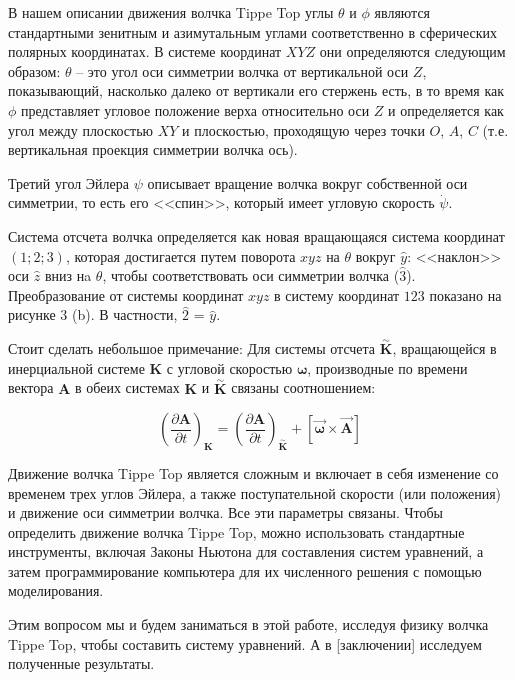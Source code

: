 \documentclass[a4paper,11.5pt]{article} %
\begin{document}
В нашем описании движения волчка Tippe Top углы $\theta$ и $\phi$ являются стандартными зенитным и азимутальным углами соответственно в сферических полярных координатах. В системе координат $XYZ$ они определяются следующим образом: $\theta$ -- это угол оси симметрии волчка от вертикальной оси $Z$, показывающий, насколько далеко от вертикали его стержень есть, в то время как $\phi$ представляет угловое положение верха относительно оси $Z$ и определяется как угол между плоскостью $XY$ и плоскостью, проходящую через точки $O$, $A$, $C$ (т.е. вертикальная проекция симметрии волчка ось).

Третий угол Эйлера $\psi$ описывает вращение волчка вокруг собственной оси симметрии, то есть его <<спин>>, который имеет угловую скорость $\dot{\psi}$.

Система отсчета волчка определяется как новая вращающаяся система координат $(1;2;3)$, которая достигается путем поворота $xyz$ на $\theta$ вокруг $\hat{y}$: <<наклон>> оси $\hat{z}$ вниз нa $\theta$, чтобы соответствовать оси симметрии волчка ($\hat{3}$). Преобразование от системы координат $xyz$ в систему координат $123$ показано на рисунке 3 (b). В частности, $\hat{2}$ = $\hat{y}$.

Стоит сделать небольшое примечание:
Для системы отсчета $\mathbf{\stackrel{\sim}{\textbf{K}}}$, вращающейся в инерциальной системе $\textbf{K}$ с угловой скоростью $\mathbf{\omega}$, производные по времени вектора $\textbf{A}$ в обеих системах $\textbf{K}$ и $\mathbf{\stackrel{\sim}{\textbf{K}}}$ связаны соотношением:

\begin{equation}
\boxed{
	\left(\frac{\partial \textbf{A}}{\partial t}\right)_{\textbf{K}} = \left( 			\frac{\partial \textbf{A}}{\partial t} \right)_{\mathbf{\stackrel{\sim}				{\textbf{K}}}} + \left[\mathbf{\overrightarrow{\omega}}\times \mathbf{\overrightarrow{A}}\right]
	}
	\label{eq1} 
\end{equation}

Движение волчка Tippe Top является сложным и включает в себя изменение со временем трех углов Эйлера, а также поступательной скорости (или положения) и движение оси симметрии волчка. Все эти параметры связаны. Чтобы определить движение волчка Tippe Top, можно использовать стандартные инструменты, включая Законы Ньютона для составления систем уравнений, а затем программирование компьютера для их численного решения с помощью моделирования.

Этим вопросом мы и будем заниматься в этой работе, исследуя физику волчка Tippe Top, чтобы составить систему уравнений. А в [заключении] исследуем полученные результаты.
\end{document}
